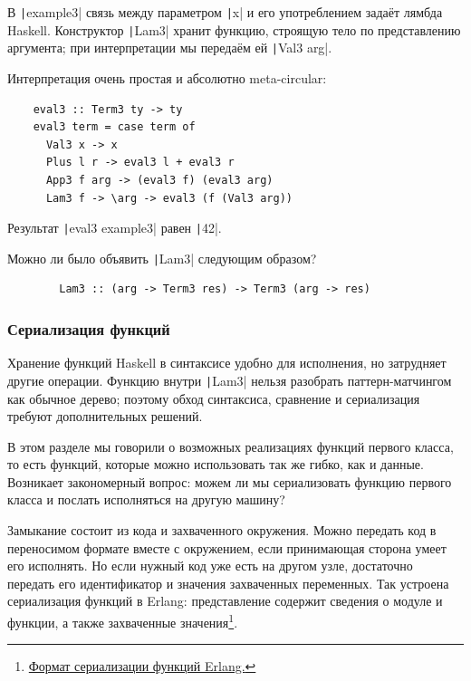 В \texttt|example3| связь между параметром \texttt|x| и его употреблением задаёт лямбда Haskell.
Конструктор \texttt|Lam3| хранит функцию, строящую тело по представлению аргумента; при интерпретации мы передаём ей \texttt|Val3 arg|.

Интерпретация очень простая и абсолютно meta-circular:
\begin{verbatim}
    eval3 :: Term3 ty -> ty
    eval3 term = case term of
      Val3 x -> x
      Plus l r -> eval3 l + eval3 r
      App3 f arg -> (eval3 f) (eval3 arg)
      Lam3 f -> \arg -> eval3 (f (Val3 arg))
\end{verbatim}
Результат \texttt|eval3 example3| равен \texttt|42|.

\begin{task}
    Можно ли было объявить \texttt|Lam3| следующим образом?
    \begin{verbatim}
        Lam3 :: (arg -> Term3 res) -> Term3 (arg -> res)
    \end{verbatim}
\end{task}

\subsubsection{Сериализация функций}

Хранение функций Haskell в синтаксисе удобно для исполнения, но затрудняет другие операции.
Функцию внутри \texttt|Lam3| нельзя разобрать паттерн-матчингом как обычное дерево; поэтому обход синтаксиса, сравнение и сериализация требуют дополнительных решений.

В этом разделе мы говорили о возможных реализациях функций первого класса, то есть функций, которые можно использовать так же гибко, как и данные.
Возникает закономерный вопрос: можем ли мы сериализовать функцию первого класса и послать исполняться на другую машину?

Замыкание состоит из кода и захваченного окружения.
Можно передать код в переносимом формате вместе с окружением, если принимающая сторона умеет его исполнять.
Но если нужный код уже есть на другом узле, достаточно передать его идентификатор и значения захваченных переменных.
Так устроена сериализация функций в Erlang: представление содержит сведения о модуле и функции, а также захваченные значения\footnote{\href{https://www.erlang.org/doc/apps/erts/erl_ext_dist.html\#new_fun_ext}{Формат сериализации функций Erlang.}}.

